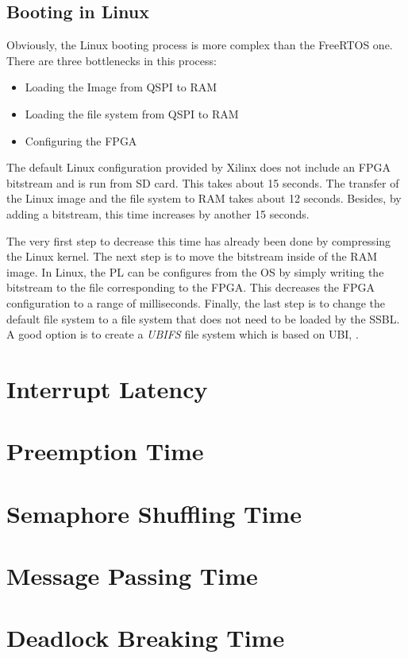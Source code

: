 \subsection{Booting in Linux}
Obviously, the Linux booting process is more complex than the FreeRTOS one. 
There are three bottlenecks in this process:
\begin{itemize}
	\item Loading the Image from \ac{QSPI} to \ac{RAM}
	\item Loading the file system from \ac{QSPI} to \ac{RAM}
	\item Configuring the \ac{FPGA}
\end{itemize}
The default Linux configuration provided by Xilinx does not include an \ac{FPGA} bitstream and is run from \ac{SD} card.
This takes about 15 seconds.
The transfer of the Linux image and the file system to \ac{RAM} takes about 12 seconds. 
Besides, by adding a bitstream, this time increases by another 15 seconds.   
\par
The very first step to decrease this time has already been done by compressing the Linux kernel.
The next step is to move the bitstream inside of the RAM image. 
In Linux, the \ac{PL} can be configures from the \ac{OS} by simply writing the bitstream to the file corresponding to the \ac{FPGA}. 
This decreases the \ac{FPGA} configuration to a range of milliseconds. 
Finally, the last step is to change the default file system to a file system that does not need to be loaded by the \ac{SSBL}.
A good option is to create a \textit{\ac{UBIFS}} file system which is based on \ac{UBI}, .

\section{Interrupt Latency}
\section{Preemption Time}
\section{Semaphore Shuffling Time}
\section{Message Passing Time}
\section{Deadlock Breaking Time}